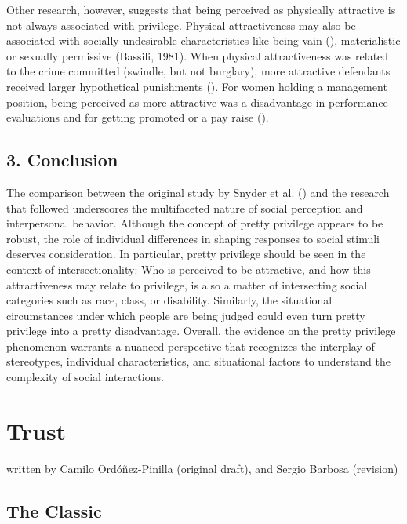 \documentclass[
  letterpaper,
]{book}
\begin{document}
Other research, however, suggests that being perceived as physically
attractive is not always associated with privilege. Physical
attractiveness may also be associated with socially undesirable
characteristics like being vain (), materialistic or sexually permissive (Bassili, 1981).
When physical attractiveness was related to the crime committed
(swindle, but not burglary), more attractive defendants received larger
hypothetical punishments (). For women holding a management position, being
perceived as more attractive was a disadvantage in performance
evaluations and for getting promoted or a pay raise
().

\section{3. Conclusion}\label{conclusion-10}

The comparison between the original study by Snyder et al.
() and the research that followed
underscores the multifaceted nature of social perception and
interpersonal behavior. Although the concept of pretty privilege appears
to be robust, the role of individual differences in shaping responses to
social stimuli deserves consideration. In particular, pretty privilege
should be seen in the context of intersectionality: Who is perceived to
be attractive, and how this attractiveness may relate to privilege, is
also a matter of intersecting social categories such as race, class, or
disability. Similarly, the situational circumstances under which people
are being judged could even turn pretty privilege into a pretty
disadvantage. Overall, the evidence on the pretty privilege phenomenon
warrants a nuanced perspective that recognizes the interplay of
stereotypes, individual characteristics, and situational factors to
understand the complexity of social interactions.


\chapter{\texorpdfstring{{Trust}}{Trust}}\label{trust}

{written by Camilo Ordóñez-Pinilla (original draft), and Sergio Barbosa
(revision)}

\section{The Classic}\label{the-classic-11}
\end{document}
